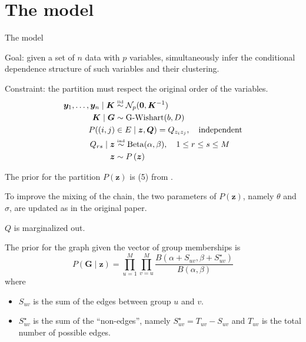 
\section{The model}

\begin{frame}{The model}

\alert{Goal}: given a set of $n$ data with $p$ variables, simultaneously infer the conditional dependence structure of such variables and their clustering.

\pause

\alert{Constraint}: the partition must respect the original order of the variables.
\pause
\begin{align*}
    \bm{y}_1, \ldots, \bm{y}_n \mid \bm{K} & \overset{\text{\tiny{iid}}}{\sim} \mathcal{N}_p(\mathbf{0}, \bm{K}^{-1} ) \\
    \bm{K} \mid \bm{G} & \sim \operatorname{G-Wishart}(b, D)\\
    P((i,j)&\in E\mid \bm{z},\bm{Q}) = Q_{z_{i} z_{j}},\quad \text{independent}\\
        Q_{rs} \mid \bm{z} &\overset{\text{\tiny{ind}}}{\sim} \operatorname{Beta}(\alpha,\beta), \quad 1\leq r\leq s\leq M\\
    \bm{z} & \sim P\left(\bm{z}\right)
\end{align*}

The prior for the \alert{partition} $P(\bm{z})$ is (5) from \textcite{martinezNonparametricChangePoint2014}.

To improve the mixing of the chain, the two parameters of $P(\bm{z})$, namely $\theta$ and $\sigma$, are updated as in the original paper.

\end{frame}

\begin{frame}

$Q$ is marginalized out.
\pause

The prior for the \alert{graph} given the vector of group memberships is
\[
    P(\bm{G}\mid \bm{z})
    =
    \prod_{u=1}^{M}\prod_{v=u}^{M}
    \frac{B(\alpha + S_{uv}, \beta+ S^{\star}_{uv})}{B(\alpha,\beta)}
\]
where 
\begin{itemize}
    \item $S_{uv}$ is the sum of the edges between group $u$ and $v$.
    \item $S^{\star}_{uv}$ is the sum of the ``non-edges'', namely $S^{\star}_{uv} = T_{uv} - S_{uv}$ and $T_{uv}$ is the total number of possible edges.
\end{itemize}


\end{frame}


